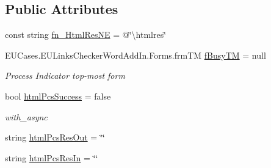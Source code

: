 \subsection*{Public Attributes}
\begin{DoxyCompactItemize}
\item 
const string \hyperlink{class_e_u_cases_1_1_e_u_links_checker_word_add_in_1_1_e_u_links_checker_add_in_a831884662eba551c6cb4e188c6976225}{fn\+\_\+\+Html\+Res\+N\+E} = @\char`\"{}\textbackslash{}htmlres\char`\"{}
\item 
E\+U\+Cases.\+E\+U\+Links\+Checker\+Word\+Add\+In.\+Forms.\+frm\+T\+M \hyperlink{class_e_u_cases_1_1_e_u_links_checker_word_add_in_1_1_e_u_links_checker_add_in_a533c0178b68cbc45db50d83b6033f7a4}{f\+Busy\+T\+M} = null
\begin{DoxyCompactList}\small\item\em Process Indicator top-\/most form \end{DoxyCompactList}\item 
bool \hyperlink{class_e_u_cases_1_1_e_u_links_checker_word_add_in_1_1_e_u_links_checker_add_in_a1b2865468a968cedfaffc6af215769bd}{html\+Pcs\+Success} = false
\begin{DoxyCompactList}\small\item\em with\+\_\+async \end{DoxyCompactList}\item 
string \hyperlink{class_e_u_cases_1_1_e_u_links_checker_word_add_in_1_1_e_u_links_checker_add_in_a2ea50f274c8e8197608759b563d481f4}{html\+Pcs\+Res\+Out} = \char`\"{}\char`\"{}
\item 
string \hyperlink{class_e_u_cases_1_1_e_u_links_checker_word_add_in_1_1_e_u_links_checker_add_in_a2a7146e2fb7780f7dec2d8d369d50c74}{html\+Pcs\+Res\+In} = \char`\"{}\char`\"{}
\end{DoxyCompactItemize}
